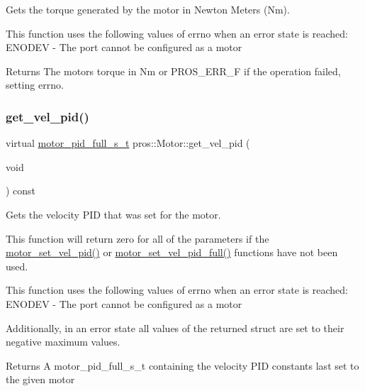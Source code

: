 Gets the torque generated by the motor in Newton Meters (Nm). 

This function uses the following values of errno when an error state is reached\+: E\+N\+O\+D\+EV -\/ The port cannot be configured as a motor

\begin{DoxyReturn}{Returns}
The motor\textquotesingle{}s torque in Nm or P\+R\+O\+S\+\_\+\+E\+R\+R\+\_\+F if the operation failed, setting errno. 
\end{DoxyReturn}
\mbox{\label{classpros_1_1Motor_a2b939563c3b915d7b8ce3dd1dece6208}} 
\subsubsection{\texorpdfstring{get\+\_\+vel\+\_\+pid()}{get\_vel\_pid()}}
{\footnotesize\ttfamily virtual \hyperlink{motors_8h_a0295cbf49f5c70c17b5fa962bd25febd}{motor\+\_\+pid\+\_\+full\+\_\+s\+\_\+t} pros\+::\+Motor\+::get\+\_\+vel\+\_\+pid (\begin{DoxyParamCaption}\item[{void}]{ }\end{DoxyParamCaption}) const\hspace{0.3cm}{\ttfamily [virtual]}}



Gets the velocity P\+ID that was set for the motor. 

This function will return zero for all of the parameters if the \hyperlink{motors_8h_a4255880d012ed0ec856f302536755d8a}{motor\+\_\+set\+\_\+vel\+\_\+pid()} or \hyperlink{motors_8h_acdec538d8f08e8b5946294f84f017e8e}{motor\+\_\+set\+\_\+vel\+\_\+pid\+\_\+full()} functions have not been used.

This function uses the following values of errno when an error state is reached\+: E\+N\+O\+D\+EV -\/ The port cannot be configured as a motor

Additionally, in an error state all values of the returned struct are set to their negative maximum values.

\begin{DoxyReturn}{Returns}
A motor\+\_\+pid\+\_\+full\+\_\+s\+\_\+t containing the velocity P\+ID constants last set to the given motor 
\end{DoxyReturn}
\mbox{\label{classpros_1_1Motor_abe51732c37c2ec72a8bdceac7f6962cb}} 
